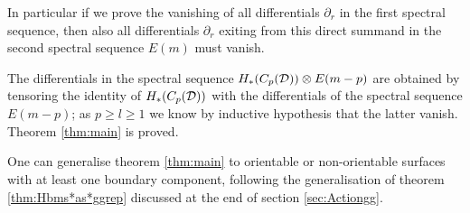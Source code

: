 In particular if we prove the vanishing of all differentials $\partial_r$
in the first spectral sequence, then also all differentials
$\partial_r$ exiting from this direct summand in the
second spectral sequence $E(m)$ must vanish.

The differentials in the spectral sequence $H_*(C_p(\mathcal{D}))\otimes E(m-p)$
are obtained by tensoring the identity of $H_*(C_p(\mathcal{D}))$ with the differentials
of the spectral sequence $E(m-p)$; as $p\geq l\geq 1$ we know by inductive hypothesis
that the latter vanish. Theorem \ref{thm:main} is proved.

One can generalise theorem \ref{thm:main} to orientable or non-orientable
surfaces with at least one boundary component, following the generalisation
of theorem \ref{thm:Hbms*as*ggrep} discussed at the end of section \ref{sec:Actiongg}.